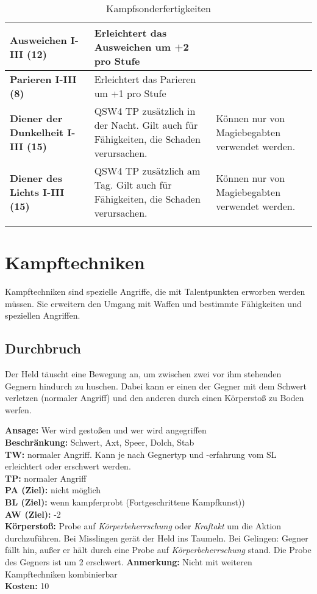 \begin{longtable}{| p{4cm} | p{8cm} | p{3cm} |}
\hline
\textbf{Ausweichen I-III (12)} & Erleichtert das Ausweichen um +2 pro Stufe & \\

\hline
\textbf{Parieren I-III (8)} & Erleichtert das Parieren um +1 pro Stufe & \\

\hline
\textbf{Diener der Dunkelheit I-III (15)} & QSW4 TP zusätzlich in der Nacht. Gilt auch für Fähigkeiten, die Schaden verursachen. & Können nur von Magiebegabten verwendet werden. \\

\hline
\textbf{Diener des Lichts I-III (15)} & QSW4 TP zusätzlich am Tag. Gilt auch für Fähigkeiten, die Schaden verursachen. & Können nur von Magiebegabten verwendet werden. \\

\hline
\caption{Kampfsonderfertigkeiten}
\label{tab:Kampfsonderfertigkeiten}
\end{longtable}


\section{Kampftechniken}
Kampftechniken sind spezielle Angriffe, die mit Talentpunkten erworben werden müssen. Sie erweitern den Umgang mit Waffen und bestimmte Fähigkeiten und speziellen Angriffen.

\subsection{Durchbruch}
Der Held täuscht eine Bewegung an, um zwischen zwei vor ihm stehenden Gegnern hindurch zu huschen. Dabei kann er einen der Gegner mit dem Schwert verletzen (normaler Angriff) und den anderen durch einen Körperstoß zu Boden werfen.

\textbf{Ansage:} Wer wird gestoßen und wer wird angegriffen \\
\textbf{Beschränkung:} Schwert, Axt, Speer, Dolch, Stab \\
\textbf{TW:} normaler Angriff. Kann je nach Gegnertyp und -erfahrung vom SL erleichtert oder erschwert werden. \\
\textbf{TP:} normaler Angriff \\
\textbf{PA (Ziel):} nicht möglich \\
\textbf{BL (Ziel):} wenn kampferprobt (Fortgeschrittene Kampfkunst)) \\
\textbf{AW (Ziel):} -2 \\
\textbf{Körperstoß:} Probe auf \textit{Körperbeherrschung} oder \textit{Kraftakt} um die Aktion durchzuführen. Bei Misslingen gerät der Held ins Taumeln. Bei Gelingen: Gegner fällt hin, außer er hält durch eine Probe auf \textit{Körperbeherrschung} stand. Die Probe des Gegners ist um 2 erschwert.
\textbf{Anmerkung:} Nicht mit weiteren Kampftechniken kombinierbar \\
\textbf{Kosten:} 10

